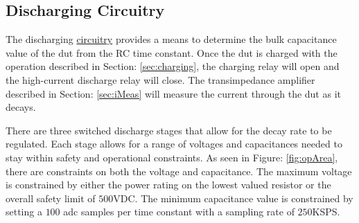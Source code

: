 \subsection{Discharging Circuitry}

The discharging \hyperlink{sch:discharging}{circuitry} provides a means to determine the bulk capacitance value of the \gls{dut} from the RC time constant. Once the \gls{dut} is charged with the operation described in Section: \ref{sec:charging}, the charging relay will open and the high-current discharge relay will close. The transimpedance amplifier described in Section: \ref{sec:iMeas} will measure the current through the \gls{dut} as it decays.

There are three switched discharge stages that allow for the decay rate to be regulated. Each stage allows for a range of voltages and capacitances needed to stay within safety and operational constraints. As seen in Figure: \ref{fig:opArea}, there are constraints on both the voltage and capacitance. The maximum voltage is constrained by either the power rating on the lowest valued resistor or the overall safety limit of $500$VDC. The minimum capacitance value is constrained by setting a $100$ \gls{adc} samples per time constant with a sampling rate of $250$KSPS.



